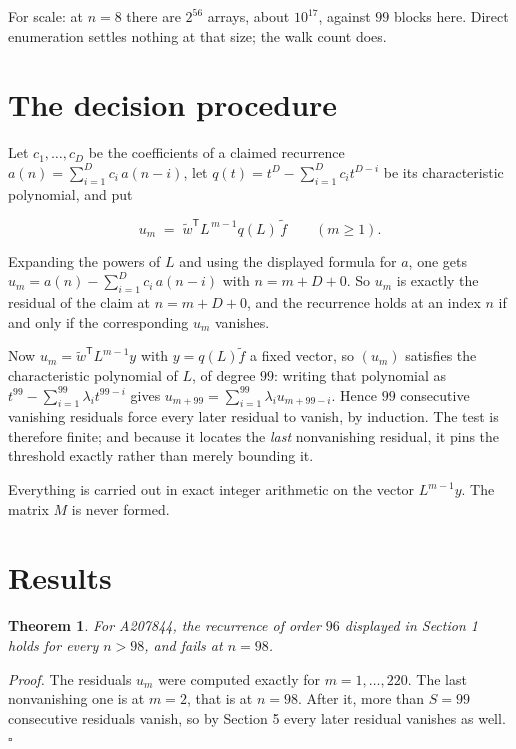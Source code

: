 \documentclass[11pt]{article}
\newtheorem{theorem}{Theorem}
\theoremstyle{definition}
\begin{document}
For scale: at $n = 8$ there are $2^{56}$ arrays, about $10^{17}$, against $99$ blocks here. Direct enumeration settles nothing at that size; the walk count does.

\section{The decision procedure}

Let $c_1,\dots,c_D$ be the coefficients of a claimed recurrence $a(n) = \sum_{i=1}^{D} c_i\,a(n-i)$, let $q(t) = t^{D} - \sum_{i=1}^{D} c_i t^{D-i}$ be its characteristic polynomial, and put

\[u_m \;=\; \tilde w^{\mathsf T} L^{\,m-1} q(L)\,\tilde f \qquad (m \ge 1).\]

Expanding the powers of $L$ and using the displayed formula for $a$, one gets $u_m = a(n) - \sum_{i=1}^{D} c_i\,a(n-i)$ with $n = m + D + 0$. So $u_m$ is exactly the residual of the claim at $n = m + D + 0$, and the recurrence holds at an index $n$ if and only if the corresponding $u_m$ vanishes.

Now $u_m = \tilde w^{\mathsf T} L^{m-1} y$ with $y = q(L)\tilde f$ a fixed vector, so $(u_m)$ satisfies the characteristic polynomial of $L$, of degree $99$: writing that polynomial as $t^{99} - \sum_{i=1}^{99} \lambda_i t^{99-i}$ gives $u_{m+99} = \sum_{i=1}^{99} \lambda_i u_{m+99-i}$. Hence $99$ consecutive vanishing residuals force every later residual to vanish, by induction. The test is therefore finite; and because it locates the {\itshape last} nonvanishing residual, it pins the threshold exactly rather than merely bounding it.

Everything is carried out in exact integer arithmetic on the vector $L^{m-1}y$. The matrix $M$ is never formed.

\section{Results}

\begin{theorem} For A207844, the recurrence of order $96$ displayed in Section 1 holds for every $n > 98$, and fails at $n = 98$.\end{theorem}

{\itshape Proof.} The residuals $u_m$ were computed exactly for $m = 1,\dots,220$. The last nonvanishing one is at $m = 2$, that is at $n = 98$. After it, more than $S = 99$ consecutive residuals vanish, so by Section 5 every later residual vanishes as well. $\square$
\end{document}
